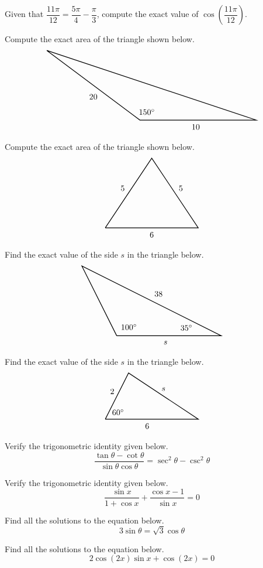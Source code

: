 \documentclass[12pt,letterpaper]{exam}
\begin{document}
\begin{questions}
\newpage
\question[10] Given that $\dfrac{11\pi}{12}= \dfrac{5\pi}{4} - \dfrac{\pi}{3}$, compute the exact value of $\cos \left( \dfrac{11\pi}{12} \right)$. 



\newpage
\question[10] Compute the exact area of the triangle shown below. 
	\[
	\begin{tikzpicture}
	\draw[line width=0.03cm] (-4,3) -- (0,0) -- (5,0) -- (-4,3);
	\node at (0.3,0.35) {$150^\circ$};
	\node at (2.4,-0.3) {$10$};
	\node at (-2,1) {$20$};
	\end{tikzpicture}
	\]



\newpage
\question[10] Compute the exact area of the triangle shown below.
	\[
	\begin{tikzpicture}
	\draw[line width=0.03cm] (-2,0) -- (0,3) -- (2,0) -- (-2,0);
	\node at (-1.25,1.7) {$5$};
	\node at (1.25,1.7) {$5$};
	\node at (0,-0.3) {$6$};
	\end{tikzpicture}
	\]



\newpage
\question[10] Find the exact value of the side $s$ in the triangle below. 
	\[
	\begin{tikzpicture}[scale=1.5]
	\draw[line width=0.03cm] (-1,0) -- (-2,2) -- (2,0) -- (-1,0);
	\node at (-0.65,0.25) {$100^\circ$};
	\node at (1.0,0.23) {$35^\circ$};
	\node at (0.2,1.2) {$38$};
	\node at (0.4,-0.2) {$s$};
	\end{tikzpicture}
	\]



\newpage
\question[10] Find the exact value of the side $s$ in the triangle below.
	\[
	\begin{tikzpicture}
	\draw[line width=0.03cm] (0,0) -- (1,2) -- (4,0) -- (0,0);
	\node at (0.55,0.3) {$60^\circ$};
	\node at (0.3,1.2) {$2$};
	\node at (1.8,-0.3) {$6$};
	\node at (2.5,1.3) {$s$};
	\end{tikzpicture}
	\]



\newpage
\question[10] Verify the trigonometric identity given below.
	\[
	\dfrac{\tan \theta - \cot \theta}{\sin \theta \cos \theta}= \sec^2 \theta - \csc^2 \theta
	\]



\newpage
\question[10] Verify the trigonometric identity given below.
	\[
	\dfrac{\sin x}{1 + \cos x} + \dfrac{\cos x - 1}{\sin x}= 0 
	\]



\newpage
\question[10] Find all the solutions to the equation below.
	\[
	3\sin \theta= \sqrt{3} \cos \theta
	\]



\newpage
\question[10] Find all the solutions to the equation below.
	\[
	2 \cos(2x) \sin x + \cos(2x)= 0 
	\]


\end{questions}
\end{document}
